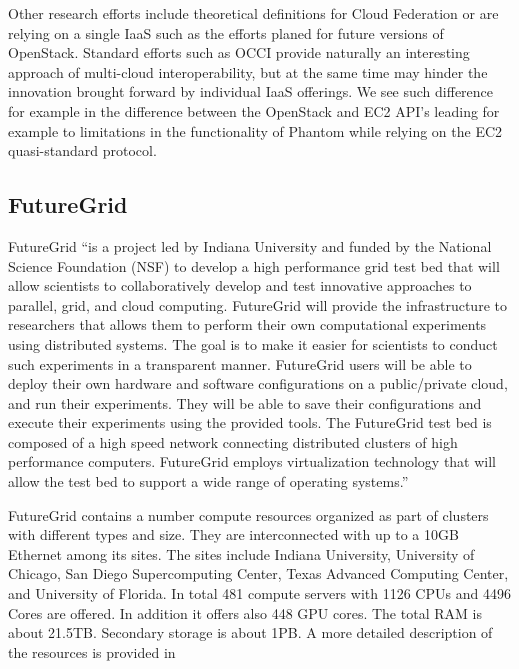 \documentclass{tex/sig-alternate-2013}
\newcommand{\todo}[1]{{\color{red}{#1}}}
\begin{document}
Other research efforts include theoretical definitions for Cloud Federation \cite{kurze2011cloudfederation} or are relying on a single IaaS such as the efforts planed for future versions of OpenStack. Standard efforts such as OCCI provide naturally an interesting approach of multi-cloud interoperability, but at the same time may hinder the innovation brought forward by individual IaaS offerings. We see such difference for example in the difference between the OpenStack and EC2 API's leading for example to limitations in the functionality of Phantom while relying on the EC2 quasi-standard protocol.

\todo{DO NOT READ TILL YOU FIND ANOTHER READ}

\subsection{FutureGrid}



FutureGrid \cite{las2010gce,las12fg-bookchapter} ``is a project led by Indiana University and funded by the National Science Foundation (NSF) to develop a high performance grid test bed that will allow scientists to collaboratively develop and test innovative approaches to parallel, grid, and cloud computing. FutureGrid will provide the infrastructure to researchers that allows them to perform their own computational experiments using distributed systems. The goal is to make it easier for scientists to conduct such experiments in a transparent manner.  FutureGrid users will be able to deploy their own hardware and software configurations on a public/private cloud, and run their experiments. They will be able to save their configurations and execute their experiments using the provided tools. The FutureGrid test bed is composed of a high speed network connecting distributed clusters of high performance computers. FutureGrid employs virtualization technology that will allow the test bed to support a wide range of operating systems.''



FutureGrid contains a number compute resources organized as part of clusters with different types and size. They are interconnected with up to a 10GB Ethernet among its sites. The sites include Indiana University, University of Chicago, San Diego Supercomputing Center, Texas Advanced Computing Center, and University of Florida.  In total 481 compute servers with 1126 CPUs and 4496 Cores are offered. In addition it offers also 448 GPU cores. The total RAM is about 21.5TB. Secondary storage is about 1PB. A more detailed description of the resources is provided in \cite{vonLaszewski-bigdata-bookchapter2014}
\end{document}
